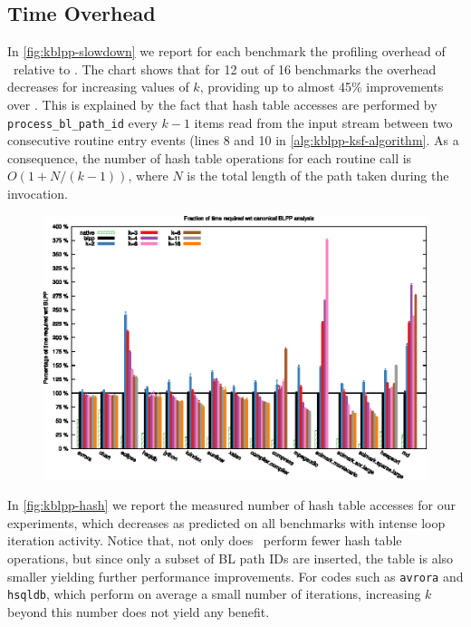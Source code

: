 \subsection{Time Overhead}
\label{ss:eval-kblpp-time}

In \myfigure\ref{fig:kblpp-slowdown} we report for each benchmark the profiling overhead of \kblpp\ relative to \blpp. The chart shows that for 12 out of 16 benchmarks the overhead decreases for increasing values of $k$, providing up to almost 45\% improvements over \blpp. This is explained by the fact that hash table accesses are performed by {\tt process\_bl\_path\_id} every $k-1$ items read from the input stream between two consecutive routine entry events (lines 8 and 10 in \myalgorithm\ref{alg:kblpp-ksf-algorithm}. As a consequence, the number of hash table operations for each routine call is $O(1+N/(k-1))$, where $N$ is the total length of the path taken during the invocation.

\ifdefined\noauthorea
\begin{figure}[!ht]
\begin{center}
\includegraphics[width=\textwidth]{figures/kblpp-slowdown/kblpp-slowdown.eps}
\caption{\protect}
\end{center}
\end{figure}
\fi

\noindent In \myfigure\ref{fig:kblpp-hash} we report the measured number of hash table accesses for our experiments, which decreases as predicted on all benchmarks with intense loop iteration activity. Notice that, not only does \kblpp\ perform fewer hash table operations, but since only a subset of BL path IDs are inserted, the table is also smaller yielding further performance improvements. For codes such as {\tt avrora} and {\tt hsqldb}, which perform on average a small number of iterations, increasing $k$ beyond this number does not yield any benefit.

